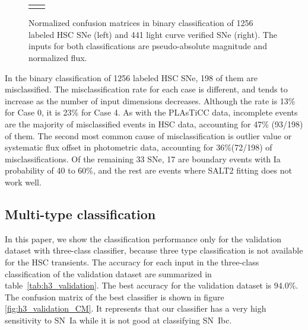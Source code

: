 \documentclass[useamsfonts]{pasj01}
\begin{document}
\begin{figure}[htbp]
\begin{tabular}{cc}
\begin{minipage}{0.5\hsize}
\begin{center}
            \end{center}
        \end{minipage}
    \end{tabular}
    \caption{%
  Normalized confusion matrices in binary classification of 1256 labeled HSC SNe (left) and 441 light curve verified SNe (right).
  The inputs for both classifications are pseudo-absolute magnitude and normalized flux.
}%
    \label{fig:h2_test_CM}
\end{figure}
%

In the binary classification of 1256 labeled HSC SNe, 198 of them are misclassified.
The misclassification rate for each case is different, and tends to increase as the number of input dimensions decreases.
Although the rate is 13\% for Case 0, it is 23\% for Case 4.
As with the PLAsTiCC data, incomplete events are the majority of misclassified events in HSC data, accounting for 47\% (93/198) of them.
The second most common cause of misclassification is outlier value or systematic flux offset in photometric data, accounting for 36\%(72/198) of misclassifications.
Of the remaining 33 SNe, 17 are boundary events with Ia probability of 40 to 60\%, and the rest are events where SALT2 fitting does not work well.


%
%
\subsection{Multi-type classification}
\label{sec:h3}
%
In this paper, we show the classification performance only for the validation dataset with three-class classifier, because three type classification is not available for the HSC transients.
%
The accuracy for each input in the three-class classification of the validation dataset are summarized in table\ \ref{tab:h3_validation}.
The best accuracy for the validation dataset is 94.0\%.
The confusion matrix of the best classifier is shown in figure \ref{fig:h3_validation_CM}.
It represents that our classifier has a very high sensitivity to SN~Ia while it is not good at classifying SN~Ibc.
\end{document}
